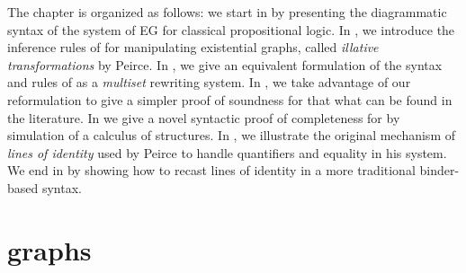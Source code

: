 The chapter is organized as follows: we start in  by presenting
the diagrammatic syntax of the system  of EG for classical
propositional logic. In , we introduce the inference rules of
 for manipulating existential graphs, called \emph{illative
transformations} by Peirce. In , we give an equivalent
formulation of the syntax and rules of  as a \emph{multiset}
rewriting system. In , we take advantage of our
reformulation to give a simpler proof of soundness for  that what can
be found in the literature. In  we give a novel
syntactic proof of completeness for  by simulation of a calculus of
structures. In , we illustrate the original mechanism of
\emph{lines of identity} used by Peirce to handle quantifiers and equality in
his  system. We end in  by showing how to recast lines
of identity in a more traditional binder-based syntax.



\section{ graphs}

